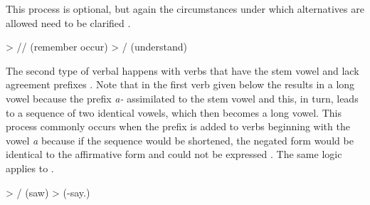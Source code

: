 This process is optional, but again the circumstances under which alternatives are allowed need to be clarified .
%
\begin{exe}
	\ex	\label{ex:does not understand phon}
	\begin{xlist}
		\ex	{} > \slash{}\slash{}  (remember occur)  
		\ex	{} > \slash{} \newline\hspace*{1em}(understand)
	\end{xlist}
\end{exe}
%

The second type of verbal  happens with verbs that have the stem vowel  and lack  agreement prefixes . Note that in the first verb given below the  results in a long vowel because the  prefix \textit{a-} assimilated to the stem vowel and this, in turn, leads to a sequence of two identical vowels, which then becomes a long vowel. This process commonly occurs when the  prefix is added to verbs beginning with the vowel \textit{a} because if the sequence would be shortened, the negated form would be identical to the affirmative form and  could not be expressed . The same logic applies to  .
%
\begin{exe}
	\label{ex:a e e phon}
	\begin{xlist}
		\ex	\label{ex:sawPHON}  > \slash{} (saw\tsc{.pfv-pret})
		\ex	{} >  (-say.\tsc{ipfv-icvb})
	\end{xlist}
\end{exe}

